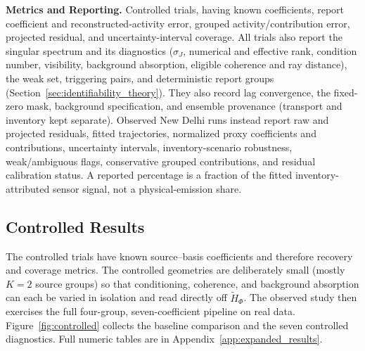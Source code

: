 \noindent\textbf{Metrics and Reporting.}
Controlled trials, having known coefficients, report coefficient and
reconstructed-activity error, grouped activity/contribution error, projected
residual, and uncertainty-interval coverage.  All trials also report the singular
spectrum and its diagnostics (\(\sigma_J\), numerical and effective rank, condition
number, visibility, background absorption, eligible coherence and ray distance), the
weak set, triggering pairs, and deterministic report groups
(Section~\ref{sec:identifiability_theory}).  They also record lag convergence, the
fixed-zero mask, background specification, and ensemble provenance (transport and
inventory kept separate).  Observed New Delhi runs instead report raw and
projected residuals, fitted trajectories, normalized proxy coefficients and
contributions, uncertainty intervals, inventory-scenario robustness,
weak/ambiguous flags, conservative grouped contributions, and residual calibration
status.  A reported percentage is a fraction of the fitted inventory-attributed
sensor signal, not a physical-emission share.

\subsection{Controlled Results}
\label{subsec:controlled_results}

The controlled trials have known source--basis coefficients and therefore recovery
and coverage metrics.  The controlled geometries are deliberately small (mostly
\(K=2\) source groups) so that conditioning, coherence, and background absorption
can each be varied in isolation and read directly off \(\widetilde H_\Phi\).  The
observed study then exercises the full four-group, seven-coefficient pipeline on
real data.  Figure~\ref{fig:controlled} collects the baseline comparison and the
seven controlled diagnostics.  Full numeric tables are in
Appendix~\ref{app:expanded_results}.


